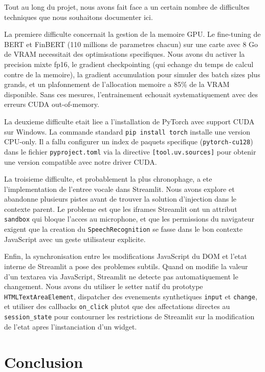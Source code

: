 \documentclass[12pt, a4paper]{article}
\begin{document}
Tout au long du projet, nous avons fait face a un certain nombre de difficultes
techniques que nous souhaitons documenter ici.

La premiere difficulte concernait la gestion de la memoire GPU. Le fine-tuning de
BERT et FinBERT (110 millions de parametres chacun) sur une carte avec 8 Go de
VRAM necessitait des optimisations specifiques. Nous avons du activer la precision
mixte fp16, le gradient checkpointing (qui echange du temps de calcul contre de la
memoire), la gradient accumulation pour simuler des batch sizes plus grands, et un
plafonnement de l'allocation memoire a 85\% de la VRAM disponible. Sans ces mesures,
l'entrainement echouait systematiquement avec des erreurs CUDA out-of-memory.

La deuxieme difficulte etait liee a l'installation de PyTorch avec support CUDA
sur Windows. La commande standard \texttt{pip install torch} installe une version
CPU-only. Il a fallu configurer un index de paquets specifique (\texttt{pytorch-cu128})
dans le fichier \texttt{pyproject.toml} via la directive \texttt{[tool.uv.sources]}
pour obtenir une version compatible avec notre driver CUDA.

La troisieme difficulte, et probablement la plus chronophage, a ete l'implementation
de l'entree vocale dans Streamlit. Nous avons explore et abandonne plusieurs pistes
avant de trouver la solution d'injection dans le contexte parent. Le probleme est
que les iframes Streamlit ont un attribut \texttt{sandbox} qui bloque l'acces au
microphone, et que les permissions du navigateur exigent que la creation du
\texttt{SpeechRecognition} se fasse dans le bon contexte JavaScript avec un geste
utilisateur explicite.

Enfin, la synchronisation entre les modifications JavaScript du DOM et l'etat interne
de Streamlit a pose des problemes subtils. Quand on modifie la valeur d'un textarea
via JavaScript, Streamlit ne detecte pas automatiquement le changement. Nous avons du
utiliser le setter natif du prototype \texttt{HTMLTextAreaElement}, dispatcher des
evenements synthetiques \texttt{input} et \texttt{change}, et utiliser des callbacks
\texttt{on\_click} plutot que des affectations directes au \texttt{session\_state}
pour contourner les restrictions de Streamlit sur la modification de l'etat apres
l'instanciation d'un widget.

\section{Conclusion}
\end{document}
